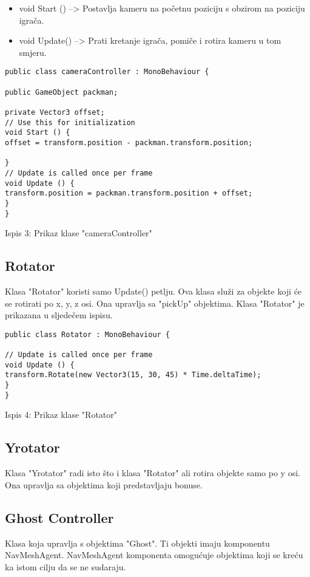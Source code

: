 \begin{itemize}
\item void Start () --> Postavlja kameru na početnu poziciju s obzirom na poziciju igrača.
 
\item void Update() --> Prati kretanje igrača, pomiče i rotira kameru u tom smjeru.


\end{itemize}

\begin{verbatim}
public class cameraController : MonoBehaviour {

public GameObject packman;

private Vector3 offset;
// Use this for initialization
void Start () {
offset = transform.position - packman.transform.position;

}
// Update is called once per frame
void Update () {
transform.position = packman.transform.position + offset;
}
}
\end{verbatim}
\begin{center}
	
	Ispis 3: Prikaz klase "cameraController"
\end{center}

\subsection{Rotator}
Klasa "Rotator" koristi samo Update() petlju. Ova klasa služi za objekte koji će se rotirati po x, y, z osi. Ona upravlja sa "pickUp" objektima. Klasa "Rotator" je prikazana u sljedečem ispisu.
\begin{verbatim}
public class Rotator : MonoBehaviour {

// Update is called once per frame
void Update () {
transform.Rotate(new Vector3(15, 30, 45) * Time.deltaTime);
}
}
\end{verbatim}
\begin{center}
	
	Ispis 4: Prikaz klase "Rotator"
\end{center}


\subsection{Yrotator}
Klasa "Yrotator" radi isto što i klasa "Rotator" ali rotira objekte samo po y osi. Ona upravlja sa objektima koji predstavljaju bonuse.

\subsection{Ghost Controller}
Klasa koja upravlja s objektima "Ghost". Ti objekti imaju komponentu NavMeshAgent. NavMeshAgent komponenta omogućuje objektima koji se kreću ka istom cilju da se ne sudaraju.

